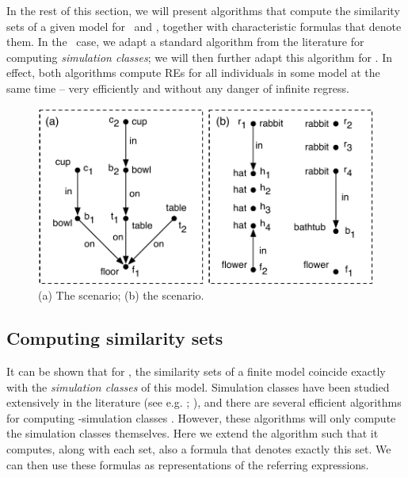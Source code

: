 In the rest of this section, we will present algorithms that compute
the similarity sets of a given model for \alc\ and \el, together with
characteristic formulas that denote them.  In the \alc\ case, we adapt
a standard algorithm from the literature for computing
\emph{simulation classes}; we will then further adapt this algorithm
for \el.  In effect, both algorithms compute REs for all individuals
in some model at the same time -- very efficiently and without any
danger of infinite regress.


\begin{figure}[t]
  \centering
  \includegraphics[width=\columnwidth]{pic-dale-haddock}
  \caption{(a) The 
    scenario; (b) the  scenario.}
  \label{fig:dale-haddock}
\end{figure}


\subsection{Computing similarity sets}

It can be shown that for \alc, the similarity sets of a finite model
coincide exactly with the \emph{simulation classes} of this model.
Simulation classes have been studied extensively in the literature
(see e.g. ; ), and there are several
efficient algorithms for computing \alc-simulation classes
\cite{hopc:algo71,paig:thre87,dovier04:_effic_algor_for_comput_bisim_equiv}.
However, these algorithms will only compute the simulation classes
themselves. Here we extend the  algorithm such
that it computes, along with each set, also a formula that denotes
exactly this set.  We can then use these formulas as representations
of the referring expressions.

